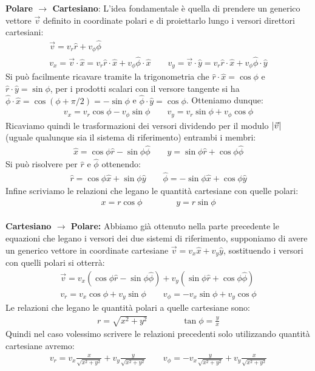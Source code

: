 \documentclass[12pt,a4paper]{book}
\begin{document}
\textbf{Polare $\rightarrow$ Cartesiano}: L'idea fondamentale è quella di prendere un generico vettore $\vec{v}$ definito in coordinate polari e di proiettarlo lungo i versori direttori cartesiani:
%
\begin{gather*}
\vec{v}=v_r\hat{r}+v_\phi\hat{\phi}\\
v_x=\vec{v}\cdot\hat{x}=v_r\hat{r}\cdot\hat{x}+v_\phi\hat{\phi}\cdot\hat{x} \qquad v_y=\vec{v}\cdot\hat{y}=v_r\hat{r}\cdot\hat{x}+v_\phi\hat{\phi}\cdot\hat{y}
\end{gather*} 
%
Si può facilmente ricavare tramite la trigonometria che $\hat{r}\cdot\hat{x}=\cos\phi$ e $\hat{r}\cdot\hat{y}=\sin\phi$, per i prodotti scalari con il versore tangente si ha $\hat{\phi}\cdot\hat{x}=\cos(\phi+\pi/2)=-\sin\phi$ e $\hat{\phi}\cdot\hat{y}=\cos\phi$. Otteniamo dunque:
%
\begin{gather*}
v_x=v_r\cos\phi-v_\phi\sin\phi \qquad v_y=v_r\sin\phi+v_\phi\cos\phi
\end{gather*} 
%
Ricaviamo quindi le trasformazioni dei versori dividendo per il modulo $\qty|\vec{v}|$ (uguale qualunque sia il sistema di riferimento) entrambi i membri:
%
\begin{gather*}
\hat{x}=\cos\phi\hat{r}-\sin\phi\hat{\phi} \qquad \hat{y}=\sin\phi\hat{r}+\cos\phi\hat{\phi}
\end{gather*} 
%
Si può risolvere per $\hat{r}$ e $\hat{\phi}$ ottenendo:
%
\begin{gather*}
\hat{r}=\cos\phi\hat{x}+\sin\phi\hat{y} \qquad \hat{\phi}=-\sin\phi\hat{x}+\cos\phi\hat{y}
\end{gather*} 
%
Infine scriviamo le relazioni che legano le quantità cartesiane con quelle polari:
%
\begin{gather*}
x=r\cos\phi \qquad \qquad y=r\sin\phi
\end{gather*} 
%
\\
\textbf{Cartesiano $\rightarrow$ Polare:} Abbiamo già ottenuto nella parte precedente le equazioni che legano i versori dei due sistemi di riferimento, supponiamo di avere un generico vettore in coordinate cartesiane $\vec{v}=v_x\hat{x}+v_y\hat{y}$, sostituendo i versori con quelli polari si otterrà:
%
\begin{gather*}
\vec{v}=v_x(\cos\phi\hat{r}-\sin\phi\hat{\phi})+v_y(\sin\phi\hat{r}+\cos\phi\hat{\phi}) \\
v_r=v_x\cos\phi+v_y\sin\phi \qquad v_\phi=-v_x\sin\phi+v_y\cos\phi
\end{gather*} 
%
Le relazioni che legano le quantità polari a quelle cartesiane sono:
%
\begin{gather*}
r=\sqrt{x^2+y^2} \qquad \qquad \tan\phi=\frac{y}{x}
\end{gather*} 
%
Quindi nel caso volessimo scrivere le relazioni precedenti solo utilizzando quantità cartesiane avremo:
%
\begin{gather*}
v_r=v_x\frac{x}{\sqrt{x^2+y^2}}+v_y\frac{y}{\sqrt{x^2+y^2}} \qquad v_\phi=-v_x\frac{y}{\sqrt{x^2+y^2}}+v_y\frac{x}{\sqrt{x^2+y^2}}
\end{gather*} 
%
\end{document}
